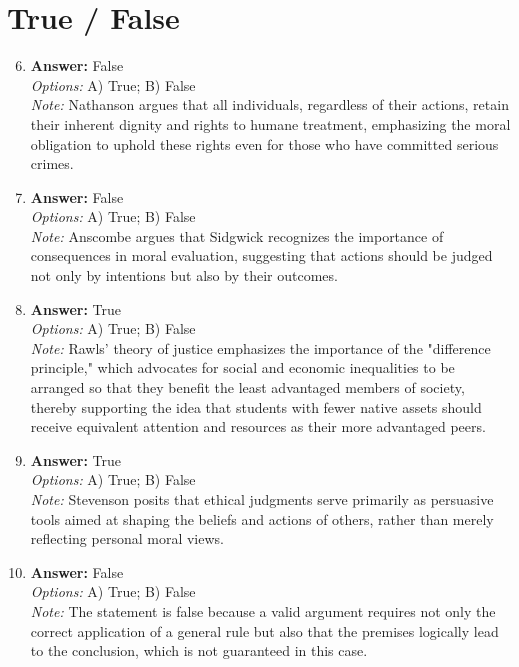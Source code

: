 \documentclass[12pt]{article}
\begin{document}
\section*{True / False}
\begin{enumerate}[label=\arabic*.]
\setcounter{enumi}{5}
\item \textbf{Answer:} False
\\ \textit{Options:} A) True; B) False
\\ \textit{Note:} Nathanson argues that all individuals, regardless of their actions, retain their inherent dignity and rights to humane treatment, emphasizing the moral obligation to uphold these rights even for those who have committed serious crimes.
\item \textbf{Answer:} False
\\ \textit{Options:} A) True; B) False
\\ \textit{Note:} Anscombe argues that Sidgwick recognizes the importance of consequences in moral evaluation, suggesting that actions should be judged not only by intentions but also by their outcomes.
\item \textbf{Answer:} True
\\ \textit{Options:} A) True; B) False
\\ \textit{Note:} Rawls' theory of justice emphasizes the importance of the "difference principle," which advocates for social and economic inequalities to be arranged so that they benefit the least advantaged members of society, thereby supporting the idea that students with fewer native assets should receive equivalent attention and resources as their more advantaged peers.
\item \textbf{Answer:} True
\\ \textit{Options:} A) True; B) False
\\ \textit{Note:} Stevenson posits that ethical judgments serve primarily as persuasive tools aimed at shaping the beliefs and actions of others, rather than merely reflecting personal moral views.
\item \textbf{Answer:} False
\\ \textit{Options:} A) True; B) False
\\ \textit{Note:} The statement is false because a valid argument requires not only the correct application of a general rule but also that the premises logically lead to the conclusion, which is not guaranteed in this case.
\end{enumerate}
\end{document}
